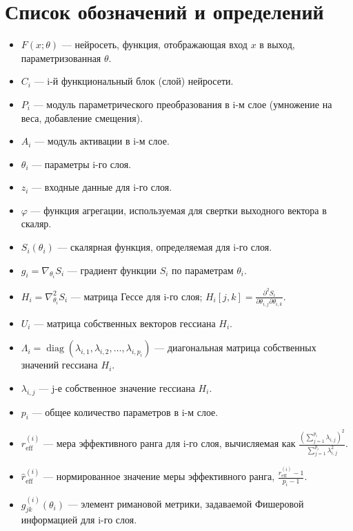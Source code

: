 \documentclass[a4paper,12pt]{article}
\begin{document}
\newpage

\section*{Список обозначений и определений}

\begin{itemize}
    \item \(F(x;\theta)\) --- нейросеть, функция, отображающая вход \(x\) в выход, параметризованная \(\theta\).
    \item \(C_i\) --- i-й функциональный блок (слой) нейросети.
    \item \(P_i\) --- модуль параметрического преобразования в i-м слое (умножение на веса, добавление смещения).
    \item \(A_i\) --- модуль активации в i-м слое.
    \item \(\theta_i\) --- параметры i-го слоя.
    \item \(z_i\) --- входные данные для i-го слоя.
    \item \(\varphi\) --- функция агрегации, используемая для свертки выходного вектора в скаляр.
    \item \(S_i(\theta_i)\) --- скалярная функция, определяемая для i-го слоя.
    \item \(g_i = \nabla_{\theta_i} S_i\) --- градиент функции \(S_i\) по параметрам \(\theta_i\).
    \item \(H_i = \nabla^2_{\theta_i} S_i\) --- матрица Гессе для i-го слоя; \(H_i[j,k] = \frac{\partial^2 S_i}{\partial \theta_{i,j}\partial \theta_{i,k}}\).
    \item \(U_i\) --- матрица собственных векторов гессиана \(H_i\).
    \item \(\Lambda_i = \operatorname{diag}(\lambda_{i,1}, \lambda_{i,2}, \dots, \lambda_{i,p_i})\) --- диагональная матрица собственных значений гессиана \(H_i\).
    \item \(\lambda_{i,j}\) --- j-е собственное значение гессиана \(H_i\).
    \item \(p_i\) --- общее количество параметров в i-м слое.
    \item \(r_{\text{eff}}^{(i)}\) --- мера эффективного ранга для i-го слоя, вычисляемая как \(\frac{\left(\sum_{j=1}^{p_i} \lambda_{i,j}\right)^2}{\sum_{j=1}^{p_i}\lambda_{i,j}^2}\).
    \item \(\hat{r}_{\text{eff}}^{(i)}\) --- нормированное значение меры эффективного ранга, \(\frac{r_{\text{eff}}^{(i)} - 1}{p_i - 1}\).
    \item \(g^{(i)}_{jk}(\theta_i)\) --- элемент римановой метрики, задаваемой Фишеровой информацией для i-го слоя.

\end{itemize}
\end{document}
